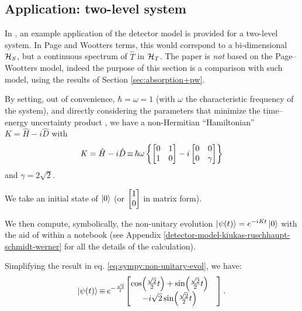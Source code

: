 \citereset\subsection{Application: two-level system}

In \cite{RuschhauptAbsorption}, an example application of the detector model
is provided for a two-level system.
In Page and Wootters terms,
this would corrspond to a bi-dimensional $\mathcal{H}_S$, but a continuous
spectrum of $\hat{T}$ in $\mathcal{H}_T$. The paper is \emph{not} based on
the Page--Wootters model, indeed the purpose of this section is a comparison
with such model, using the results of Section \ref{sec:absorption+pw}.

By setting, out of convenience, $\hbar = \omega = 1$
(with $\omega$ the characteristic frequency of the system),
and directly considering the parameters
that minimize the time--energy uncertainty product \parencite{RuschhauptAbsorption},
we have a non-Hermitian ``Hamiltonian''
$\mathit{K} = \hat{H} - i\hat{D}$ with
\begin{equation}\label{eq:complexpot}
  \mathit{K} = \hat{H} - i\hat{D} \operatorname*{\equiv}
    \hbar\omega\left\{
      \left[\begin{matrix}0 & 1\\1 & 0\end{matrix}\right] -
      i \left[\begin{matrix}0 & 0\\0 & \gamma \end{matrix}\right]
    \right\}
\end{equation}
and $\gamma = 2\sqrt{2}$.

We take an initial state of $\ket{0}$
(or $\mqty[1\\0]$ in matrix form).

We then compute, symbolically, the non-unitary evolution
$\ket{\psi(t)} = e^{-i\mathit{K}t}\ket{0}$
with the aid of  \parencite{comp:sympy} within a  \parencite{comp:jupyter} notebook
(see Appendix \ref{detector-model-kiukas-ruschhaupt-schmidt-werner} for all the details of the calculation).

Simplifying the result in eq. \eqref{eq:sympy:non-unitary-evol}, we have:
\begin{equation}
  \ket{\psi(t)} \repr e^{-\frac{\sqrt{2}}{t}} \mqty[
    \cos(\frac{\sqrt{2}}{2}t) + \sin(\frac{\sqrt{2}}{2}t)& \\
                     -i\sqrt{2} \sin(\frac{\sqrt{2}}{2}t)&
  ] \,\text{.}
\end{equation}

